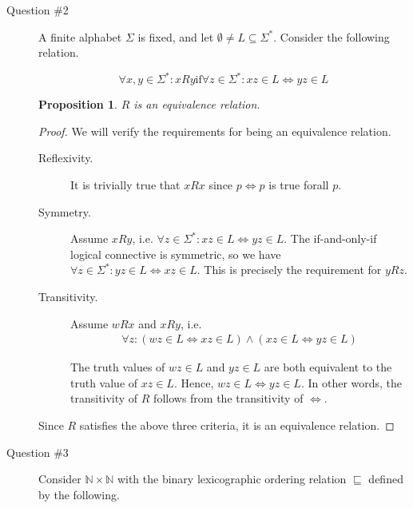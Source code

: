 \documentclass[letterpaper,11pt]{article}
\newcommand{\N}{\mathbb{N}}
\newtheorem{proposition}{Proposition}
\begin{document}
\begin{description}
\item[Question \#2] A finite alphabet $\Sigma$ is fixed, and let
    $\emptyset \neq L\subseteq\Sigma^*$. Consider the following relation.

    $$
    \forall x,y\in\Sigma^* : xRy
    \text{if}
    \forall z \in \Sigma^* :
        xz \in L
        \iff
        yz \in L
    $$

    \begin{proposition}
        $R$ is an equivalence relation.
    \end{proposition}

    \begin{proof}
        We will verify the requirements for being an equivalence relation.

        \begin{description}
            \item[Reflexivity.]
                It is trivially true that $xRx$ since $p \iff p$ is true
                forall $p$.

            \item[Symmetry.]
                Assume $xRy$, i.e.
                $\forall z \in \Sigma^* : xz \in L \iff yz \in L$.
                The if-and-only-if logical connective is symmetric, so we
                have
                $\forall z \in \Sigma^* : yz \in L \iff xz \in L$.
                This is precisely the requirement for $yRz$.

            \item[Transitivity.]
                Assume $wRx$ and $xRy$, i.e.
                \begin{align*}
                    \forall z:
                    (wz\in L\iff xz\in L)
                    \land
                    (xz\in L\iff yz\in L)
                \end{align*}

                The truth values of
                $wz \in L$ and $yz \in L$
                are both equivalent to the truth value of
                $xz \in L$.
                Hence,
                $wz \in L \iff yz \in L$.
                In other words, the transitivity of $R$ follows from the
                transitivity of $\iff$.
        \end{description}

        Since $R$ satisfies the above three criteria, it is an equivalence
        relation.
    \end{proof}

\item[Question \#3]
    Consider $\N\times\N$ with the binary lexicographic ordering relation
    $\sqsubseteq$ defined by the following.


\end{description}
\end{document}
